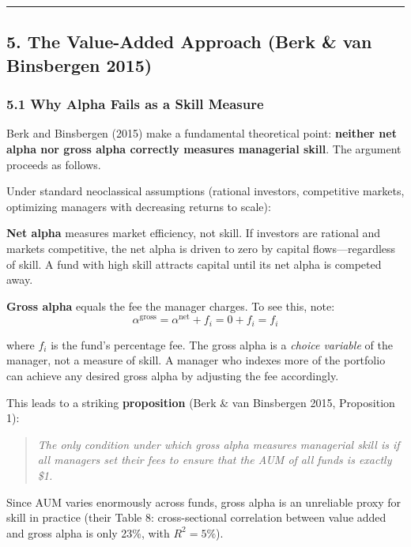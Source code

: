 \documentclass[
  letterpaper,
  DIV=11,
  numbers=noendperiod]{scrartcl}
\begin{document}
\begin{center}\rule{0.5\linewidth}{0.5pt}\end{center}

\subsection{5. The Value-Added Approach (Berk \& van Binsbergen
2015)}\label{the-value-added-approach-berk-van-binsbergen-2015}

\subsubsection{5.1 Why Alpha Fails as a Skill
Measure}\label{why-alpha-fails-as-a-skill-measure}

Berk and Binsbergen (2015) make a fundamental theoretical point:
\textbf{neither net alpha nor gross alpha correctly measures managerial
skill}. The argument proceeds as follows.

Under standard neoclassical assumptions (rational investors, competitive
markets, optimizing managers with decreasing returns to scale):

\textbf{Net alpha} measures market efficiency, not skill. If investors
are rational and markets competitive, the net alpha is driven to zero by
capital flows---regardless of skill. A fund with high skill attracts
capital until its net alpha is competed away.

\textbf{Gross alpha} equals the fee the manager charges. To see this,
note:
\[\alpha^{\text{gross}} = \alpha^{\text{net}} + f_i = 0 + f_i = f_i\]

where \(f_i\) is the fund's percentage fee. The gross alpha is a
\emph{choice variable} of the manager, not a measure of skill. A manager
who indexes more of the portfolio can achieve any desired gross alpha by
adjusting the fee accordingly.

This leads to a striking \textbf{proposition} (Berk \& van Binsbergen
2015, Proposition 1):

\begin{quote}
\emph{The only condition under which gross alpha measures managerial
skill is if all managers set their fees to ensure that the AUM of all
funds is exactly \$1.}
\end{quote}

Since AUM varies enormously across funds, gross alpha is an unreliable
proxy for skill in practice (their Table 8: cross-sectional correlation
between value added and gross alpha is only 23\%, with \(R^2 = 5\%\)).
\end{document}
